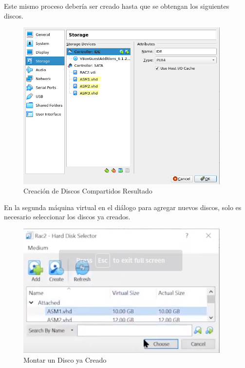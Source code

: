 \documentclass{article}
\begin{document}
Este mismo proceso debería ser creado hasta que se obtengan los siguientes discos.

\begin{figure}[H]
		\begin{center}
			\includegraphics[width=0.95\textwidth]{vm_shared_disk_result.png}
		\end{center}
		\caption{Creación de Discos Compartidos Resultado}
\end{figure}

En la segunda máquina virtual en el diálogo para agregar nuevos discos, solo es necesario seleccionar los discos ya creados.

\begin{figure}[H]
		\begin{center}
			\includegraphics[width=0.95\textwidth]{vm_shared_disk_mounting.png}
		\end{center}
		\caption{Montar un Disco ya Creado}
\end{figure}
\end{document}
